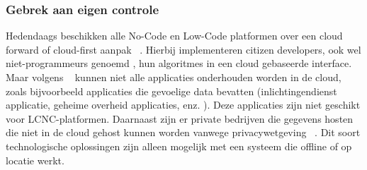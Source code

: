 \subsubsection*{Gebrek aan eigen controle}
\label{subsec:gebrek-aan-eigen-controle}
Hedendaags beschikken alle No-Code en Low-Code platformen over een cloud forward of cloud-first aanpak ~\autocite{Sufi_2023}. 
Hierbij implementeren citizen developers, ook wel niet-programmeurs genoemd , hun algoritmes in een cloud gebaseerde interface. 
Maar volgens ~\textcite{Sufi_2023} kunnen niet alle applicaties onderhouden worden in de cloud, zoals bijvoorbeeld applicaties die gevoelige data bevatten 
(inlichtingendienst applicatie, geheime overheid applicaties, enz. ). Deze applicaties zijn niet geschikt voor LCNC-platformen. 
Daarnaast zijn er private bedrijven die gegevens hosten die niet in de cloud gehost kunnen worden vanwege privacywetgeving ~\autocite{Sufi_2023}. 
Dit soort technologische oplossingen zijn alleen mogelijk met een systeem die offline of op locatie werkt.
